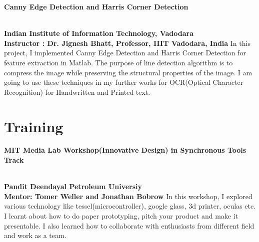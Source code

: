 \documentclass{article}
\begin{document}
\begin{large}\textbf{Canny Edge Detection and Harris Corner Detection }\end{large} \\
\textbf{Indian Institute of Information Technology, Vadodara}\\
\textbf{Instructor : Dr. Jignesh Bhatt, Professor, IIIT Vadodara, India}\hfill{} 
In this project, I implemented Canny Edge Detection and Harris Corner Detection for feature extraction in Matlab. The purpose of line detection algorithm is to compress the image while preserving the structural properties of the image. I am going to use these techniques in my further works for OCR(Optical Character Recognition) for Handwritten and Printed text.\\


\section{Training}
\begin{large}\textbf{MIT Media Lab Workshop(Innovative Design) in Synchronous Tools Track}\\ \\
\end{large}
\textbf{Pandit Deendayal Petroleum Universiy}\\
\textbf{Mentor: Tomer Weller and Jonathan Bobrow}
In this workshop, I explored various technology like tessel(microcontroller), google glass, 3d printer, oculas etc. I learnt about how to do paper prototyping, pitch your product and make it presentable. I also learned how to collaborate with enthusiasts from different field and work as a team.\\
\end{document}
